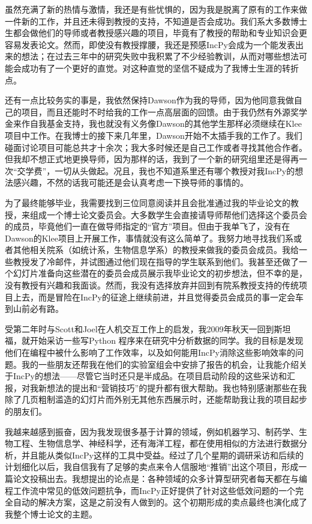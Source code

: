 \documentclass[12pt,UTF8,nofonts]{book}
\begin{document}
虽然充满了新的热情与激情，我还是有些忧惧的，因为我是脱离了原有的工作来做一件新的工作，并且还未得到教授的支持，不知道是否会成功。我们系大多数博士生都会做他们的导师或者教授感兴趣的项目，毕竟有了教授的帮助和专业知识会更容易发表论文。然而，即使没有教授撑腰，我还是预感IncPy会成为一个能发表出来的想法；在过去三年中的研究失败中我积累了不少经验教训，从而对哪些想法可能会成功有了一个更好的直觉。对这种直觉的坚信不疑成为了我博士生涯的转折点。

还有一点比较务实的事是，我依然保持Dawson作为我的导师，因为他同意我做自己的项目，而且还能时不时给我的工作一点高层面的回馈。由于我仍然有外源奖学金来作自我基金支持，我也就没有义务像Dawson的其他学生那样必须继续在Klee项目中工作。在我博士的接下来几年里，Dawson开始不太插手我的工作了。我们碰面讨论项目可能总共才十余次；我大多时候还是自己工作或者寻找其他合作者。但我却不想正式地更换导师，因为那样的话，我到了一个新的研究组里还是得再一次“交学费”，一切从头做起。况且，我也不知道系里还有哪个教授对我IncPy的想法感兴趣，不然的话我可能还是会认真考虑一下换导师的事情的。

为了最终能够毕业，我需要找到三位同意阅读并且会批准通过我的毕业论文的教授，来组成一个博士论文委员会。大多数学生会直接请导师帮他们选择这个委员会的成员，毕竟他们一直在做导师指定的“官方”项目。但由于我单飞了，没有在Dawson的Klee项目上开展工作，事情就没有这么简单了。我努力地寻找我们系或者其他相关院系（如统计系，生物信息学系）的教授来做我的委员会成员。我给一些教授发了冷邮件，并试图通过他们现在指导的学生联系到他们。我甚至还做了一个幻灯片准备向这些潜在的委员会成员展示我毕业论文的初步想法，但不幸的是，没有教授有兴趣和我面谈。然而，我没有选择放弃并回到有院系教授支持的传统项目上去，而是冒险在IncPy的征途上继续前进，并且觉得委员会成员的事一定会车到山前必有路。

\breakline

受第二年时与Scott和Joel在人机交互工作上的启发，我2009年秋天一回到斯坦福，就开始采访一些写Python 程序来在研究中分析数据的同学。我的目标是发现他们在编程中被什么影响了工作效率，以及如何能用IncPy消除这些影响效率的问题。我的一些朋友还帮我在他们的实验室组会中安排了报告的机会，让我能介绍关于IncPy的想法——尽管它当时还只是半成品。在项目启动阶段的这些采访和汇报，对我新想法的提出和“营销技巧”的提升都有很大帮助。我也特别感谢那些在我除了几页粗制滥造的幻灯片而外别无其他东西展示时，还能帮助我让我的项目起步的朋友们。

我越来越感到振奋，因为我发现很多基于计算的领域，例如机器学习、制药学、生物工程、生物信息学、神经科学，还有海洋工程，都在使用相似的方法进行数据分析，并且能从类似IncPy这样的工具中受益。经过了几个星期的调研采访和后续的计划细化以后，我自信我有了足够的卖点来令人信服地“推销”出这个项目，形成一篇论文投稿出去。我想提出的论点是：各种领域的众多计算型研究者每天都在与编程工作流中常见的低效问题抗争，而IncPy正好提供了针对这些低效问题的一个完全自动的解决方案，这是之前没有人做到的。这个初期形成的卖点最终也演化成了我整个博士论文的主题。
\end{document}
